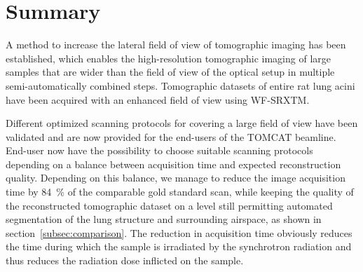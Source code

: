 \documentclass[preprint,s]{iucr}
\begin{document}
\section{Summary}\label{summary}
A method to increase the lateral field of view of tomographic imaging has been established, which enables the high-resolution tomographic imaging of large samples that are wider than the field of view of the optical setup in multiple semi-automatically combined steps. Tomographic datasets of entire rat lung acini have been acquired with an enhanced field of view using WF-SRXTM.

Different optimized scanning protocols for covering a large field of view have been validated and are now provided for the end-users of the TOMCAT beamline. End-user now have the possibility to choose suitable scanning protocols depending on a balance between acquisition time and expected reconstruction quality. Depending on this balance, we manage to reduce the image acquisition time by \SI{84}{\percent} of the comparable gold standard scan, while keeping the quality of the reconstructed tomographic dataset on a level still permitting automated segmentation of the lung structure and surrounding airspace, as shown in section~\ref{subsec:comparison}. The reduction in acquisition time obviously reduces the time during which the sample is irradiated by the synchrotron radiation and thus reduces the radiation dose inflicted on the sample.

%

\let\oldharvardurl=\harvardurl%
\renewcommand{\harvardurl}[1]{\relax}%
%
\let\harvardurl=\oldharvardurl
\end{document}
